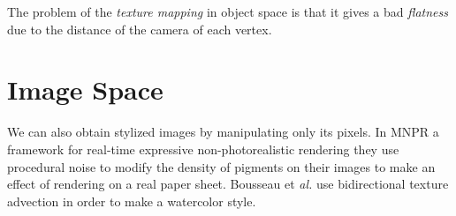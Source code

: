 The problem of the \textit{texture mapping} in object space is that it gives a bad \textit{flatness} due to the distance of the camera of each vertex.

\section{Image Space}

We can also obtain stylized images by manipulating only its pixels. In MNPR\cite{montesdeoca_mnpr:_2018} a framework for real-time expressive non-photorealistic rendering they use procedural noise to modify the density of pigments on their images to make an effect of rendering on a real paper sheet. Bousseau et \textit{al.}\cite{bousseau_video_2007} use bidirectional texture advection in order to make a watercolor style.
